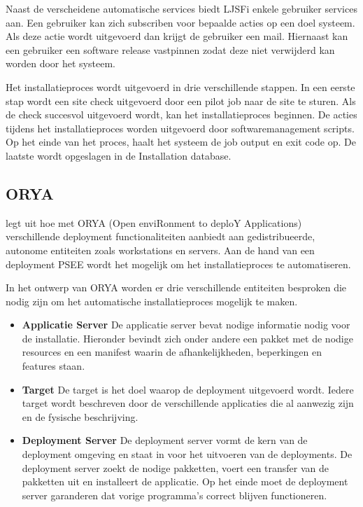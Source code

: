 Naast de verscheidene automatische services biedt LJSFi enkele gebruiker services aan.
Een gebruiker kan zich subscriben voor bepaalde acties op een doel systeem.
Als deze actie wordt uitgevoerd dan krijgt de gebruiker een mail.
Hiernaast kan een gebruiker een software release vastpinnen zodat deze niet verwijderd kan worden door het systeem.

Het installatieproces wordt uitgevoerd in drie verschillende stappen.
In een eerste stap wordt een site check uitgevoerd door een pilot job naar de site te sturen.
Als de check succesvol uitgevoerd wordt, kan het installatieproces beginnen.
De acties tijdens het installatieproces worden uitgevoerd door softwaremanagement scripts.
Op het einde van het proces, haalt het systeem de job output en exit code op.
De laatste wordt opgeslagen in de Installation database.

\subsection{ORYA}\label{sec:ORYA}
\citet{lestideau2003providing} legt uit hoe met ORYA (Open enviRonment to deploY Applications) verschillende deployment functionaliteiten aanbiedt aan gedistribueerde, autonome entiteiten zoals workstations en servers.
Aan de hand van een deployment PSEE \citep{belkhatir2007adele} wordt het mogelijk om het installatieproces te automatiseren.

In het ontwerp van ORYA worden er drie verschillende entiteiten besproken die nodig zijn om het automatische installatieproces mogelijk te maken.
\begin{itemize}
\item \textbf{Applicatie Server} De applicatie server bevat nodige informatie nodig voor de installatie.
Hieronder bevindt zich onder andere een pakket met de nodige resources en een manifest waarin de afhankelijkheden, beperkingen en features staan.
\item \textbf{Target} De target is het doel waarop de deployment uitgevoerd wordt.
Iedere target wordt beschreven door de verschillende applicaties die al aanwezig zijn en de fysische beschrijving.
\item \textbf{Deployment Server} De deployment server vormt de kern van de deployment omgeving en staat in voor het uitvoeren van de deployments. 
De deployment server zoekt de nodige pakketten, voert een transfer van de pakketten uit en installeert de applicatie.
Op het einde moet de deployment server garanderen dat vorige programma's correct blijven functioneren.
\end{itemize}

